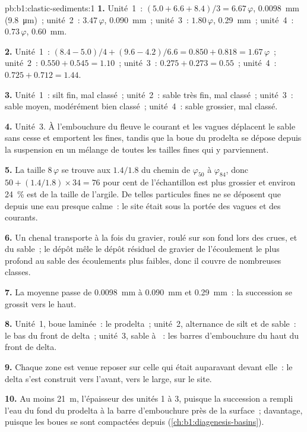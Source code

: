 \begin{solution}{pb:b1:clastic-sediments:1}
\textbf{1.} Unité~1~: $(5.0 + 6.6 + 8.4)/3 = 6.67\,\varphi$, \qty{0.0098}{mm}
(\qty{9.8}{\micro m})~; unité~2~: $3.47\,\varphi$, \qty{0.090}{mm}~; unité~3~:
$1.80\,\varphi$, \qty{0.29}{mm}~; unité~4~: $0.73\,\varphi$, \qty{0.60}{mm}.

\textbf{2.} Unité~1~: $(8.4 - 5.0)/4 + (9.6 - 4.2)/6.6 = 0.850 + 0.818 =
1.67\,\varphi$~; unité~2~: $0.550 + 0.545 = 1.10$~; unité~3~: $0.275 + 0.273 = 0.55$~;
unité~4~: $0.725 + 0.712 = 1.44$.

\textbf{3.} Unité~1~: silt fin, mal classé~; unité~2~: sable très fin, mal
classé~; unité~3~: sable moyen, modérément bien classé~; unité~4~: sable grossier,
mal classé.

\textbf{4.} Unité~3. À l'embouchure du fleuve le courant et les vagues déplacent le sable
sans cesse et emportent les fines, tandis que la boue du prodelta se dépose depuis la
suspension en un mélange de toutes les tailles fines qui y parviennent.

\textbf{5.} La taille $8\,\varphi$ se trouve aux $1.4/1.8$ du chemin de
$\varphi_{50}$ à $\varphi_{84}$, donc $50 + (1.4/1.8) \times 34 = 76$ pour cent de
l'échantillon est plus grossier et environ \qty{24}{\percent} est de la taille de l'argile. De telles particules
fines ne se déposent que depuis une eau presque calme~: le site était sous la portée
des vagues et des courants.

\textbf{6.} Un chenal transporte à la fois du gravier, roulé sur son fond lors des crues, et du
sable~; le dépôt mêle le dépôt résiduel de gravier de l'écoulement le plus profond au sable des
écoulements plus faibles, donc il couvre de nombreuses classes.

\textbf{7.} La moyenne passe de \qty{0.0098}{mm} à \qty{0.090}{mm} et
\qty{0.29}{mm}~: la succession se grossit vers le haut.

\textbf{8.} Unité~1, boue laminée~: le prodelta~; unité~2, alternance de silt et de
sable~: le bas du front de delta~; unité~3, sable à ~: les barres d'embouchure du
haut du front de delta.

\textbf{9.} Chaque zone est venue reposer sur celle qui était auparavant devant elle~:
le delta s'est construit vers l'avant, vers le large, sur le site.

\textbf{10.} Au moins \qty{21}{m}, l'épaisseur des unités 1 à 3, puisque la
succession a rempli l'eau du fond du prodelta à la barre d'embouchure
près de la surface~; davantage, puisque les boues se sont compactées depuis
(\cref{ch:b1:diagenesis-basins}).


\end{solution}
